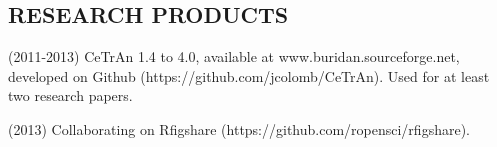 %

\newpage

%
\subsection*{RESEARCH PRODUCTS}



\begin{itemize}
\begin{sloppypar}
%
\item(2011-2013) CeTrAn 1.4 to 4.0, available at www.buridan.sourceforge.net,
developed on Github (https://github.com/jcolomb/CeTrAn).
Used for at least two research papers.

\item(2013) Collaborating on Rfigshare (https://github.com/ropensci/rfigshare).

%
%
\end{sloppypar}
\end{itemize}



